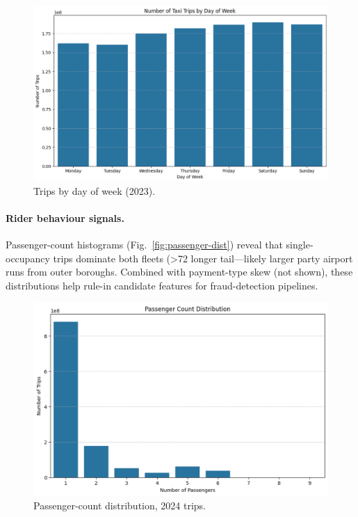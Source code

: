 \documentclass[conference]{IEEEtran}
\begin{document}
\begin{figure}[htbp]
  \centering
  \includegraphics[width=0.9\linewidth]{figures/dow_trips_yellow.png}
  \caption{Trips by day of week (2023).}
  \label{fig:dow}
\end{figure}

\paragraph*{Rider behaviour signals.}
Passenger-count histograms (Fig.~\ref{fig:passenger-dist}) reveal that
single-occupancy trips dominate both fleets (>72 %
  longer tail—likely larger party airport runs from outer boroughs.  Combined
  with payment-type skew (not shown), these distributions help rule-in candidate
  features for fraud-detection pipelines.

  \begin{figure}[htbp]
    \centering
    \includegraphics[width=0.9\linewidth]{figures/passenger_count_yellow.png}
    \caption{Passenger-count distribution, 2024 trips.}
    \label{fig:passenger-count-yellow}
  \end{figure}
\end{document}
